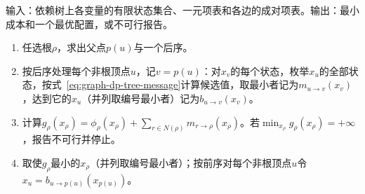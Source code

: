 \begin{algorithm}[树上的消息递推]
\label{alg:graph-dp-tree-messages}
输入：依赖树上各变量的有限状态集合、一元项表和各边的成对项表。输出：最小成本和一个最优配置，或不可行报告。
\begin{enumerate}
  \item 任选根$\rho$，求出父点$p(u)$与一个后序。
  \item 按后序处理每个非根顶点$u$，记$v=p(u)$：对$x_v$的每个状态，枚举$x_u$的全部状态，按式~\eqref{eq:graph-dp-tree-message}计算候选值，取最小者记为$m_{u\to v}(x_v)$，达到它的$x_u$（并列取编号最小者）记为$b_{u\to v}(x_v)$。
  \item 计算$g_\rho(x_\rho)=\phi_\rho(x_\rho)+\sum_{r\in N(\rho)}m_{r\to\rho}(x_\rho)$。若$\min_{x_\rho}g_\rho(x_\rho)=+\infty$，报告不可行并停止。
  \item 取使$g_\rho$最小的$x_\rho$（并列取编号最小者）；按前序对每个非根顶点$u$令$x_u=b_{u\to p(u)}(x_{p(u)})$。
\end{enumerate}
\end{algorithm}

